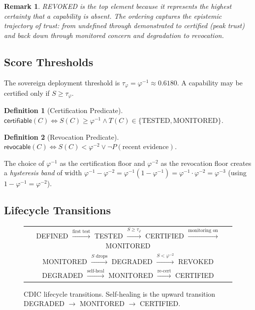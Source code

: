 \documentclass[11pt,a4paper]{article}
\newtheorem{definition}{Definition}
\newtheorem{remark}{Remark}
\begin{document}
\begin{remark}
REVOKED is the top element because it represents the highest certainty that a
capability is \emph{absent}.  The ordering captures the epistemic trajectory of trust:
from \emph{undefined} through \emph{demonstrated} to \emph{certified} (peak trust)
and back down through \emph{monitored concern} and \emph{degradation} to \emph{revocation}.
\end{remark}

\subsection{Score Thresholds}

The sovereign deployment threshold is $\tau_\varphi = \varphi^{-1} \approx 0.6180$.
A capability may be certified only if $S \ge \tau_\varphi$.

\begin{definition}[Certification Predicate]
$\mathsf{certifiable}(C) \iff S(C) \ge \varphi^{-1} \wedge T(C) \in \{\text{TESTED},\text{MONITORED}\}$.
\end{definition}

\begin{definition}[Revocation Predicate]
$\mathsf{revocable}(C) \iff S(C) < \varphi^{-2} \vee \neg P(\text{recent evidence})$.
\end{definition}

The choice of $\varphi^{-1}$ as the certification floor and $\varphi^{-2}$ as the
revocation floor creates a \emph{hysteresis band} of width $\varphi^{-1} - \varphi^{-2}
= \varphi^{-1}(1 - \varphi^{-1}) = \varphi^{-1} \cdot \varphi^{-2} = \varphi^{-3}$
(using $1 - \varphi^{-1} = \varphi^{-2}$).

\subsection{Lifecycle Transitions}

\begin{figure}[h]
\centering
\begin{tabular}{c}
DEFINED $\xrightarrow{\text{first test}}$ TESTED $\xrightarrow{S \ge \tau_\varphi}$
CERTIFIED $\xrightarrow{\text{monitoring on}}$ MONITORED \\[6pt]
MONITORED $\xrightarrow{S \text{ drops}}$ DEGRADED $\xrightarrow{S < \varphi^{-2}}$
REVOKED \\[6pt]
DEGRADED $\xrightarrow{\text{self-heal}}$ MONITORED $\xrightarrow{\text{re-cert}}$
CERTIFIED
\end{tabular}
\caption{CDIC lifecycle transitions.  Self-healing is the upward transition DEGRADED
$\to$ MONITORED $\to$ CERTIFIED.}
\end{figure}
\end{document}
